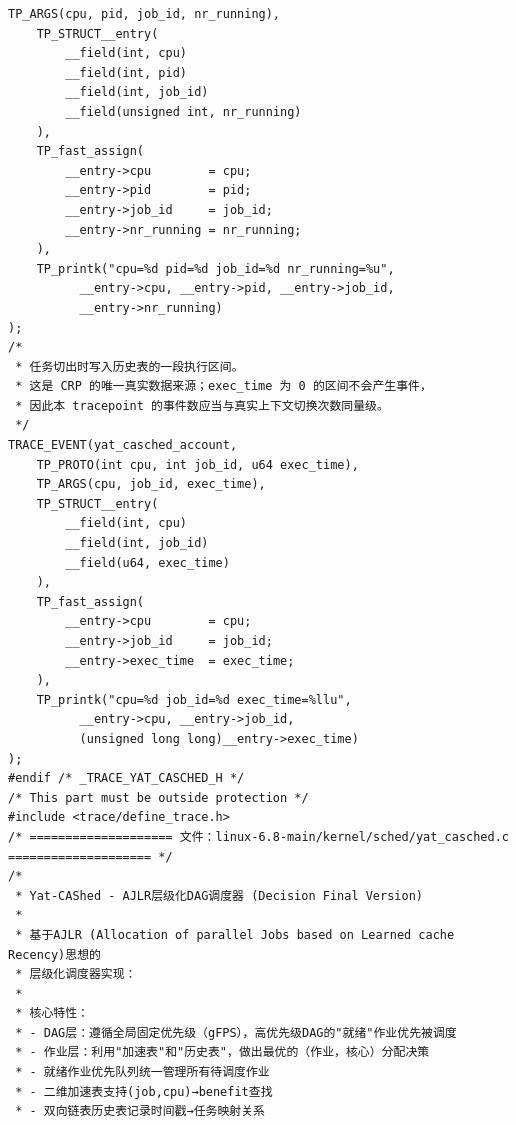 \documentclass[10pt,a4paper]{article}
\newenvironment{yatpage}{\vspace*{0pt}}{\par}
\begin{document}
\begin{yatpage}
\begin{Verbatim}[fontsize=\fontsize{8.2}{9.8}\selectfont]
	TP_ARGS(cpu, pid, job_id, nr_running),
	TP_STRUCT__entry(
		__field(int, cpu)
		__field(int, pid)
		__field(int, job_id)
		__field(unsigned int, nr_running)
	),
	TP_fast_assign(
		__entry->cpu		= cpu;
		__entry->pid		= pid;
		__entry->job_id		= job_id;
		__entry->nr_running	= nr_running;
	),
	TP_printk("cpu=%d pid=%d job_id=%d nr_running=%u",
		  __entry->cpu, __entry->pid, __entry->job_id,
		  __entry->nr_running)
);
/*
 * 任务切出时写入历史表的一段执行区间。
 * 这是 CRP 的唯一真实数据来源；exec_time 为 0 的区间不会产生事件，
 * 因此本 tracepoint 的事件数应当与真实上下文切换次数同量级。
 */
TRACE_EVENT(yat_casched_account,
	TP_PROTO(int cpu, int job_id, u64 exec_time),
	TP_ARGS(cpu, job_id, exec_time),
	TP_STRUCT__entry(
		__field(int, cpu)
		__field(int, job_id)
		__field(u64, exec_time)
	),
	TP_fast_assign(
		__entry->cpu		= cpu;
		__entry->job_id		= job_id;
		__entry->exec_time	= exec_time;
	),
	TP_printk("cpu=%d job_id=%d exec_time=%llu",
		  __entry->cpu, __entry->job_id,
		  (unsigned long long)__entry->exec_time)
);
#endif /* _TRACE_YAT_CASCHED_H */
/* This part must be outside protection */
#include <trace/define_trace.h>
/* ==================== 文件：linux-6.8-main/kernel/sched/yat_casched.c ==================== */
/*
 * Yat-CAShed - AJLR层级化DAG调度器 (Decision Final Version)
 *
 * 基于AJLR (Allocation of parallel Jobs based on Learned cache Recency)思想的
 * 层级化调度器实现：
 *
 * 核心特性：
 * - DAG层：遵循全局固定优先级（gFPS），高优先级DAG的"就绪"作业优先被调度
 * - 作业层：利用"加速表"和"历史表"，做出最优的（作业，核心）分配决策
 * - 就绪作业优先队列统一管理所有待调度作业
 * - 二维加速表支持(job,cpu)→benefit查找
 * - 双向链表历史表记录时间戳→任务映射关系
\end{Verbatim}
\end{yatpage}
\newpage
\end{document}
